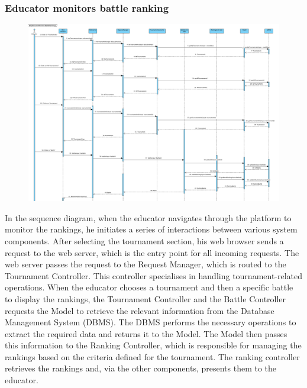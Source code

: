 \subsubsection{Educator monitors battle ranking}
\begin{figure}[H]
    \centering
    \includegraphics[width=1\textwidth]{SequenceDiagram/EducatorMonitorsBattleRanking.png}
    \label{fig:enter-label}
\end{figure}
In the sequence diagram, when the educator navigates through the platform to monitor the rankings, he initiates a series of interactions between various system components. After selecting the tournament section, his web browser sends a request to the web server, which is the entry point for all incoming requests. The web server passes the request to the Request Manager, which is routed to the Tournament Controller. This controller specialises in handling tournament-related operations. When the educator chooses a tournament and then a specific battle to display the rankings, the Tournament Controller and the Battle Controller requests the Model to retrieve the relevant information from the Database Management System (DBMS). The DBMS performs the necessary operations to extract the required data and returns it to the Model. The Model then passes this information to the Ranking Controller, which is responsible for managing the rankings based on the criteria defined for the tournament. 
The ranking controller retrieves the rankings and, via the other components, presents them to the educator.


